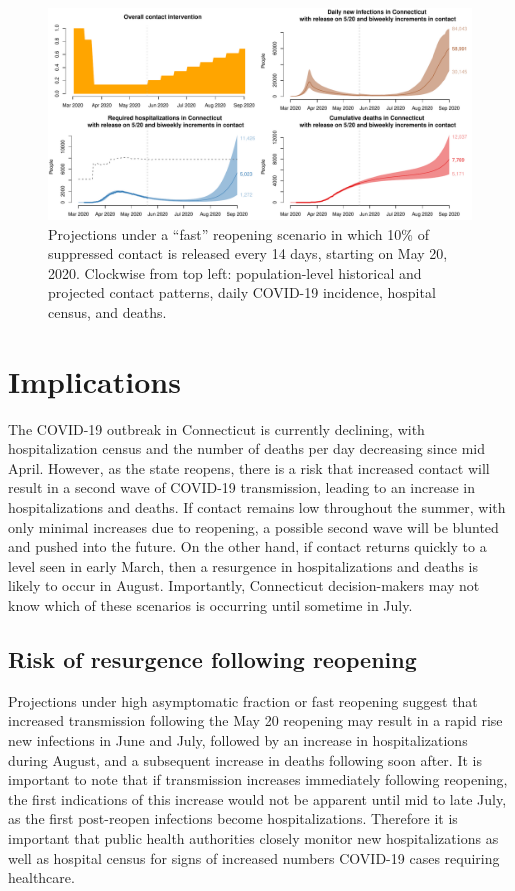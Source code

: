 \documentclass[11pt]{article}
\begin{document}
\begin{figure}
\centering
\includegraphics[width=\textwidth]{figures/fast.pdf}
\caption{Projections under a ``fast'' reopening scenario in which 10\% of suppressed contact is released every 14 days, starting on May 20, 2020.  Clockwise from top left: population-level historical and projected contact patterns, daily COVID-19 incidence, hospital census, and deaths. }
\label{fig:fast}
\end{figure}




\section*{Implications}

The COVID-19 outbreak in Connecticut is currently declining, with hospitalization census and the number of deaths per day decreasing since mid April.  However, as the state reopens, there is a risk that increased contact will result in a second wave of COVID-19 transmission, leading to an increase in hospitalizations and deaths.  If contact remains low throughout the summer, with only minimal increases due to reopening, a possible second wave will be blunted and pushed into the future.  On the other hand, if contact returns quickly to a level seen in early March, then a resurgence in hospitalizations and deaths is likely to occur in August.  Importantly, Connecticut decision-makers may not know which of these scenarios is occurring until sometime in July.  


\subsection*{Risk of resurgence following reopening} 

Projections under high asymptomatic fraction or fast reopening suggest that increased transmission following the May 20 reopening may result in a rapid rise new infections in June and July, followed by an increase in hospitalizations during August, and a subsequent increase in deaths following soon after.  It is important to note that if transmission increases immediately following reopening, the first indications of this increase would not be apparent until mid to late July, as the first post-reopen infections become hospitalizations.  Therefore it is important that public health authorities closely monitor new hospitalizations as well as hospital census for signs of increased numbers COVID-19 cases requiring healthcare.   
\end{document}
